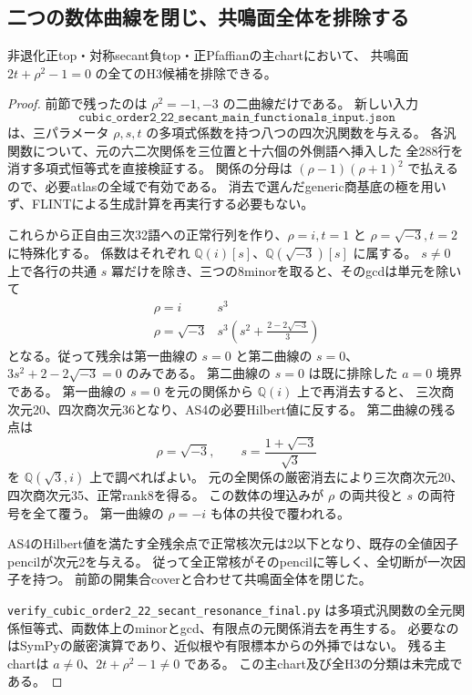 \subsection{二つの数体曲線を閉じ、共鳴面全体を排除する}
\begin{proposition}
非退化正top・対称secant負top・正Pfaffianの主chartにおいて、
共鳴面 $2t+\rho^2-1=0$ の全てのH3候補を排除できる。
\end{proposition}
\begin{proof}
前節で残ったのは $\rho^2=-1,-3$ の二曲線だけである。
新しい入力
\[
 \texttt{cubic\_order2\_22\_secant\_main\_functionals\_input.json}
\]
は、三パラメータ $\rho,s,t$ の多項式係数を持つ八つの四次汎関数を与える。
各汎関数について、元の六二次関係を三位置と十六個の外側語へ挿入した
全288行を消す多項式恒等式を直接検証する。
関係の分母は $(\rho-1)(\rho+1)^2$ で払えるので、必要atlasの全域で有効である。
消去で選んだgeneric商基底の極を用いず、FLINTによる生成計算を再実行する必要もない。

これらから正自由三次32語への正常行列を作り、$\rho=i,t=1$ と
$\rho=\sqrt{-3},t=2$ に特殊化する。
係数はそれぞれ $\mathbb Q(i)[s]$、$\mathbb Q(\sqrt{-3})[s]$ に属する。
$s\ne0$ 上で各行の共通 $s$ 冪だけを除き、三つの8minorを取ると、そのgcdは単元を除いて
\[
 \begin{array}{c|c}
 \rho=i&s^3\\
 \rho=\sqrt{-3}&s^3\left(s^2+\frac{2-2\sqrt{-3}}3\right)
 \end{array}
\]
となる。従って残余は第一曲線の $s=0$ と第二曲線の
$s=0$、$3s^2+2-2\sqrt{-3}=0$ のみである。
第二曲線の $s=0$ は既に排除した $a=0$ 境界である。
第一曲線の $s=0$ を元の関係から $\mathbb Q(i)$ 上で再消去すると、
三次商次元20、四次商次元36となり、AS4の必要Hilbert値に反する。
第二曲線の残る点は
\[
 \rho=\sqrt{-3},\qquad s=\frac{1+\sqrt{-3}}{\sqrt3}
\]
を $\mathbb Q(\sqrt3,i)$ 上で調べればよい。
元の全関係の厳密消去により三次商次元20、四次商次元35、正常rank8を得る。
この数体の埋込みが $\rho$ の両共役と $s$ の両符号を全て覆う。
第一曲線の $\rho=-i$ も体の共役で覆われる。

AS4のHilbert値を満たす全残余点で正常核次元は2以下となり、既存の全値因子pencilが次元2を与える。
従って全正常核がそのpencilに等しく、全切断が一次因子を持つ。
前節の開集合coverと合わせて共鳴面全体を閉じた。

\texttt{verify\_cubic\_order2\_22\_secant\_resonance\_final.py}
は多項式汎関数の全元関係恒等式、両数体上のminorとgcd、有限点の元関係消去を再生する。
必要なのはSymPyの厳密演算であり、近似根や有限標本からの外挿ではない。
残る主chartは $a\ne0$、$2t+\rho^2-1\ne0$ である。
この主chart及び全H3の分類は未完成である。
\end{proof}
